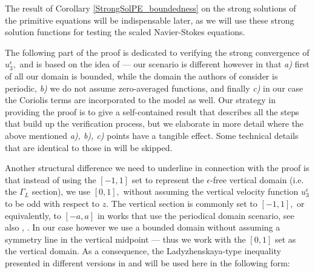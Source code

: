 \documentclass[12pt]{report}
\numberwithin{theorem}{chapter}
\numberwithin{corollary}{chapter}
\numberwithin{lemma}{chapter}
\numberwithin{remark}{chapter}
\numberwithin{definition}{chapter}
\numberwithin{prop}{chapter}
\begin{document}
The result of Corollary \ref{StrongSolPE_boundedness} on the strong solutions of the primitive equations will be indispensable later, as we will use these strong solution functions for testing the scaled Navier-Stokes equations.
  
  The following part of the proof is dedicated to verifying the strong convergence of $u_3^\epsilon,$ and is based on the idea of \cite{li2019primitive} --- our scenario is different however in that \textit{a)} first of all our domain is bounded, while the domain the authors of \cite{li2019primitive} consider is periodic, \textit{b)} we do not assume zero-averaged functions, and finally \textit{c)} in our case the Coriolis terms are incorporated to the model as well. Our strategy in providing the proof is to give a self-contained result that describes all the steps that build up the verification process, but we elaborate in more detail where the above mentioned \textit{a), b), c)} points have a tangible effect. Some technical details that are identical to those in \cite{li2019primitive} will be skipped.

Another structural difference we need to underline in connection with the proof is that instead of using the $[-1,1]$ set to represent the $\epsilon$-free vertical domain (i.e. the $\Gamma_L$ section), we use $[0,1],$ without assuming the vertical velocity function $u_3^\epsilon$ to be odd with respect to $z.$ The vertical section is commonly set to $[-1,1],$ or equivalently, to $[-a,a]$ in works that use the periodical domain scenario, see also \cite{cao2016global}, \cite{cao2017global}. In our case however we use a bounded domain without assuming a symmetry line in the vertical midpoint --- thus we work with the $[0,1]$ set as the vertical domain. As a consequence, the Ladyzhenskaya-type inequality presented in different versions in \cite{cao2003global} and \cite{li2019primitive} will be used here in the following form:
\end{document}
